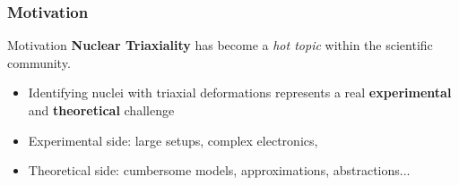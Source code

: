 \documentclass[
	11pt, %
]{beamer}
\begin{document}
\begin{frame}
	\frametitle{Motivation}
	\begin{block}{Motivation}
		\textbf{Nuclear Triaxiality} has become a \emph{hot topic} within the scientific community.
		\begin{itemize}
			\item Identifying nuclei with triaxial deformations represents a real \textbf{experimental} and \textbf{theoretical} challenge
			\item Experimental side: large setups, complex electronics, 
			\item Theoretical side: cumbersome models, approximations, abstractions...
		\end{itemize}
	\end{block}
\end{frame}
\end{document}
